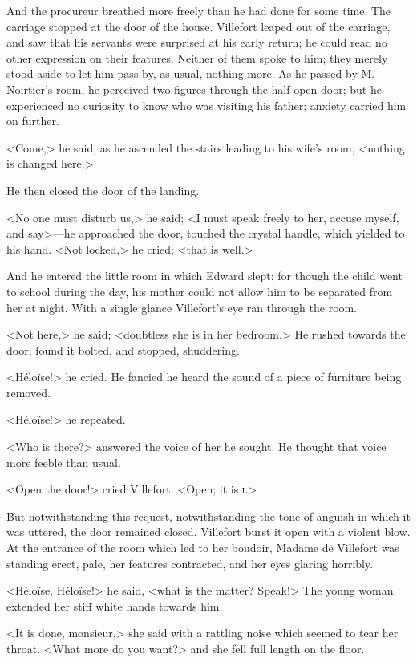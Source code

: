  And the procureur breathed more freely than he had done for some time.  The carriage stopped at the door of the house. Villefort leaped out of the carriage, and saw that his servants were surprised at his early return; he could read no other expression on their features. Neither of them spoke to him; they merely stood aside to let him pass by, as usual, nothing more. As he passed by M. Noirtier's room, he perceived two figures through the half-open door; but he experienced no curiosity to know who was visiting his father; anxiety carried him on further. 

 <Come,> he said, as he ascended the stairs leading to his wife's room, <nothing is changed here.> 

 He then closed the door of the landing. 

 <No one must disturb us,> he said; <I must speak freely to her, accuse myself, and say>—he approached the door, touched the crystal handle, which yielded to his hand. <Not locked,> he cried; <that is well.> 

 And he entered the little room in which Edward slept; for though the child went to school during the day, his mother could not allow him to be separated from her at night. With a single glance Villefort's eye ran through the room. 

 <Not here,> he said; <doubtless she is in her bedroom.> He rushed towards the door, found it bolted, and stopped, shuddering. 

 <Héloïse!> he cried. He fancied he heard the sound of a piece of furniture being removed. 

 <Héloïse!> he repeated. 

 <Who is there?> answered the voice of her he sought. He thought that voice more feeble than usual. 

 <Open the door!> cried Villefort. <Open; it is \textsc{i.}> 

 But notwithstanding this request, notwithstanding the tone of anguish in which it was uttered, the door remained closed. Villefort burst it open with a violent blow. At the entrance of the room which led to her boudoir, Madame de Villefort was standing erect, pale, her features contracted, and her eyes glaring horribly. 

 <Héloïse, Héloïse!> he said, <what is the matter? Speak!> The young woman extended her stiff white hands towards him. 

 <It is done, monsieur,> she said with a rattling noise which seemed to tear her throat. <What more do you want?> and she fell full length on the floor. 

